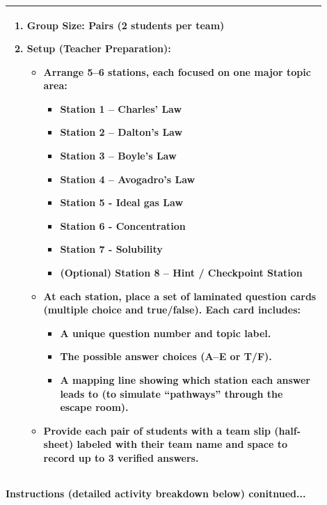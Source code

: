 \documentclass{article}
\begin{document}
{{\begin{tabular}{|p{0.9\linewidth}|}
\begin{enumerate}
    \item \textbf{Group Size:} Pairs (2 students per team)

    \item \textbf{Setup (Teacher Preparation):}
    \begin{itemize}
        \item Arrange \textbf{5–6 stations}, each focused on one major topic area:
        \begin{itemize}
            \item \textbf{Station 1 – Charles' Law}
            \item \textbf{Station 2 – Dalton's Law}
            \item \textbf{Station 3 – Boyle's Law}
            \item \textbf{Station 4 – Avogadro's Law}
            \item \textbf{Station 5 - Ideal gas Law}
            \item \textbf{Station 6 - Concentration}
            \item \textbf{Station 7 - Solubility}
            \item \textbf{(Optional) Station 8 – Hint / Checkpoint Station}
        \end{itemize}
        \item At each station, place a set of laminated question cards (multiple choice and true/false). Each card includes:
        \begin{itemize}
            \item A unique question number and topic label.
            \item The possible answer choices (A–E or T/F).
            \item A mapping line showing which station each answer leads to (to simulate “pathways” through the escape room).
        \end{itemize}
        \item Provide each pair of students with a \textbf{team slip} (half-sheet) labeled with their team name and space to record up to 3 verified answers.
    \end{itemize}
\end{enumerate}
\\
\hline
\end{tabular}
\newpage

\vspace{0.5cm}
\noindent
{\large \textbf{Instructions (detailed activity breakdown below) conitnued...}} \\

}}
\end{document}
